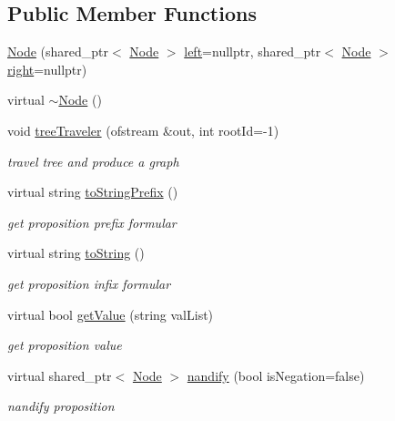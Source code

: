 \subsection*{Public Member Functions}
\begin{DoxyCompactItemize}
\item 
\hyperlink{class_node_aade5a3c528aedf9de57dd1efc83d76cb}{Node} (shared\+\_\+ptr$<$ \hyperlink{class_node}{Node} $>$ \hyperlink{class_node_a978574f2c08939cfef1041041eb9c5be}{left}=nullptr, shared\+\_\+ptr$<$ \hyperlink{class_node}{Node} $>$ \hyperlink{class_node_af68a851484bce64ed9463a50025df424}{right}=nullptr)
\item 
virtual \hyperlink{class_node_aa0840c3cb5c7159be6d992adecd2097c}{$\sim$\+Node} ()
\item 
void \hyperlink{class_node_a068e821ecc21903e5b3430e36493f390}{tree\+Traveler} (ofstream \&out, int root\+Id=-\/1)
\begin{DoxyCompactList}\small\item\em travel tree and produce a graph \end{DoxyCompactList}\item 
virtual string \hyperlink{class_node_a815b062345cf2bb42717bd16dc99ea27}{to\+String\+Prefix} ()
\begin{DoxyCompactList}\small\item\em get proposition prefix formular \end{DoxyCompactList}\item 
virtual string \hyperlink{class_node_a0746502074a232243dcac3b96f3ce2d0}{to\+String} ()
\begin{DoxyCompactList}\small\item\em get proposition infix formular \end{DoxyCompactList}\item 
virtual bool \hyperlink{class_node_afd0c2045f3955e02e3aa1e2e987f10b2}{get\+Value} (string val\+List)
\begin{DoxyCompactList}\small\item\em get proposition value \end{DoxyCompactList}\item 
virtual shared\+\_\+ptr$<$ \hyperlink{class_node}{Node} $>$ \hyperlink{class_node_a3b2e192b59b7e72908af7903c5a4e5c1}{nandify} (bool is\+Negation=false)
\begin{DoxyCompactList}\small\item\em nandify proposition \end{DoxyCompactList}\item 

\end{DoxyCompactItemize}
